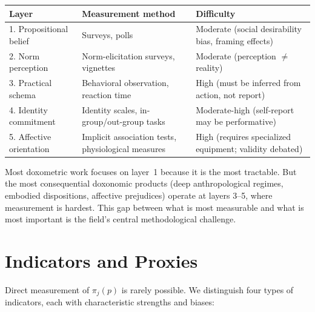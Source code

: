 \begin{center}
\begin{tabular}{lp{4.5cm}p{5cm}}
\toprule
\textbf{Layer} & \textbf{Measurement method} & \textbf{Difficulty} \\
\midrule
1. Propositional belief & Surveys, polls & Moderate (social desirability bias, framing effects) \\
2. Norm perception & Norm-elicitation surveys, vignettes & Moderate (perception $\neq$ reality) \\
3. Practical schema & Behavioral observation, reaction time & High (must be inferred from action, not report) \\
4. Identity commitment & Identity scales, in-group/out-group tasks & Moderate-high (self-report may be performative) \\
5. Affective orientation & Implicit association tests, physiological measures & High (requires specialized equipment; validity debated) \\
\bottomrule
\end{tabular}
\end{center}

Most doxometric work focuses on layer~1 because it is the most tractable.
But the most consequential doxonomic products (deep anthropological regimes, embodied dispositions, affective prejudices) operate at layers 3--5, where measurement is hardest.
This gap between what is most measurable and what is most important is the field's central methodological challenge.


\section{Indicators and Proxies}
\label{sec:ch13-indicators}

Direct measurement of $\pi_j(p)$ is rarely possible.
We distinguish four types of indicators, each with characteristic strengths and biases:

